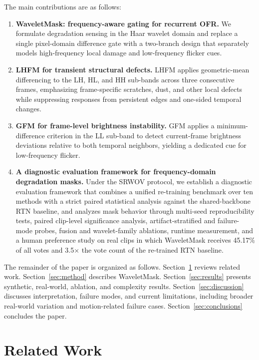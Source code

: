 {The main contributions are as follows:
\begin{enumerate}
    \item \textbf{WaveletMask: frequency-aware gating for recurrent OFR.} We formulate degradation sensing in the Haar wavelet domain and replace a single pixel-domain difference gate with a two-branch design that separately models high-frequency local damage and low-frequency flicker cues.

    \item \textbf{LHFM for transient structural defects.} LHFM applies geometric-mean differencing to the LH, HL, and HH sub-bands across three consecutive frames, emphasizing frame-specific scratches, dust, and other local defects while suppressing responses from persistent edges and one-sided temporal changes.

    \item \textbf{GFM for frame-level brightness instability.} GFM applies a minimum-difference criterion in the LL sub-band to detect current-frame brightness deviations relative to both temporal neighbors, yielding a dedicated cue for low-frequency flicker.

    \item \textbf{A diagnostic evaluation framework for frequency-domain degradation masks.} Under the SRWOV protocol, we establish a diagnostic evaluation framework that combines a unified re-training benchmark over ten methods with a strict paired statistical analysis against the shared-backbone RTN baseline, and analyzes mask behavior through multi-seed reproducibility tests, paired clip-level significance analysis, artifact-stratified and failure-mode probes, fusion and wavelet-family ablations, runtime measurement, and a human preference study on real clips in which WaveletMask receives 45.17\% of all votes and 3.5$\times$ the vote count of the re-trained RTN baseline.
\end{enumerate}

The remainder of the paper is organized as follows. Section~\ref{sec:related_work} reviews related work. Section~\ref{sec:method} describes WaveletMask. Section~\ref{sec:results} presents synthetic, real-world, ablation, and complexity results. Section~\ref{sec:discussion} discusses interpretation, failure modes, and current limitations, including broader real-world variation and motion-related failure cases. Section~\ref{sec:conclusions} concludes the paper.


\section{Related Work}\label{sec:related_work}

}
